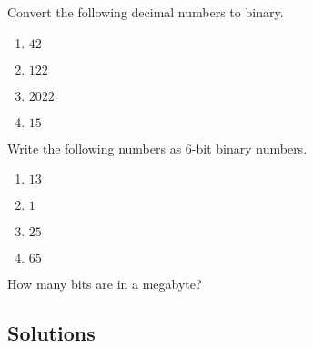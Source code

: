 \documentclass[11pt,a4paper]{report}
\begin{document}
\begin{ex}
Convert the following decimal numbers to binary.
\begin{multicols}{4}
\begin{enumerate}
\item $42$
\item $122$
\item $2022$
\item $15$
\end{enumerate}
\end{multicols} 
\end{ex}

\begin{ex}
Write the following numbers as 6-bit binary numbers.
\begin{multicols}{4}
\begin{enumerate}
\item $13$
\item $1$
\item $25$
\item $65$
\end{enumerate}
\end{multicols}
\end{ex}

\begin{ex}
How many bits are in a megabyte?
\end{ex}

\newpage
\subsection{Solutions}
\printcursols
\end{document}
